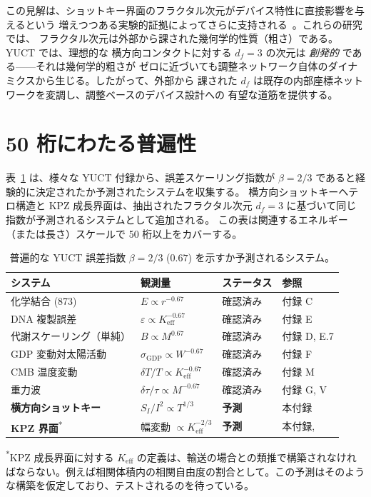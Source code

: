\documentclass[12pt,a4paper]{article}
\newcommand{\Keff}{K_{\mathrm{eff}}}
\theoremstyle{remark}
\begin{document}
	この見解は、ショットキー界面のフラクタル次元がデバイス特性に直接影響を与えるという
	増えつつある実験的証拠によってさらに支持される~\cite{FractalSchottky}。これらの研究では、
	フラクタル次元は外部から課された幾何学的性質（粗さ）である。YUCT では、理想的な
	横方向コンタクトに対する $d_f = 3$ の次元は \emph{創発的} である——それは幾何学的粗さが
	ゼロに近づいても調整ネットワーク自体のダイナミクスから生じる。したがって、外部から
	課された $d_f$ は既存の内部座標ネットワークを変調し、調整ベースのデバイス設計への
	有望な道筋を提供する。
	
	\section{50 桁にわたる普遍性}
	表~\ref{tab:universal-beta} は、様々な YUCT 付録から、誤差スケーリング指数が
	$\beta = 2/3$ であると経験的に決定されたか予測されたシステムを収集する。
	横方向ショットキーヘテロ構造と KPZ 成長界面は、抽出されたフラクタル次元
	$d_f = 3$ に基づいて同じ指数が予測されるシステムとして追加される。
	この表は関連するエネルギー（または長さ）スケールで 50 桁以上をカバーする。
	
	\begin{table}[H]
		\centering
		\caption{普遍的な YUCT 誤差指数 $\beta = 2/3$ ($0.67$) を示すか予測されるシステム。}
		\label{tab:universal-beta}
		\begin{tabular}{@{}llll@{}}
			\toprule
			\textbf{システム} & \textbf{観測量} & \textbf{ステータス} & \textbf{参照}\\
			\midrule
			化学結合 (873)      & $E \propto r^{-0.67}$               & 確認済み  & 付録 C \\
			DNA 複製誤差    & $\varepsilon \propto \Keff^{-0.67}$ & 確認済み  & 付録 E \\
			代謝スケーリング（単純）& $B \propto M^{0.67}$               & 確認済み  & 付録 D, E.7 \\
			GDP 変動対太陽活動   & $\sigma_{\mathrm{GDP}} \propto W^{-0.67}$ & 確認済み & 付録 F \\
			CMB 温度変動    & $\delta T/T \propto \Keff^{-0.67}$ & 確認済み  & 付録 M \\
			重力波       & $\delta\tau/\tau \propto M^{-0.67}$& 確認済み  & 付録 G, V \\
			\textbf{横方向ショットキー} & $S_I/I^2 \propto T^{1/3}$          & \textbf{予測} & 本付録 \\
			\textbf{KPZ 界面}\textsuperscript{*} & 幅変動 $\propto \Keff^{-2/3}$& \textbf{予測} & 本付録, \cite{KPZ}\\
			\bottomrule
		\end{tabular}
		
		\vspace{0.3cm}
		{\footnotesize \textsuperscript{*}KPZ 成長界面に対する $K_{\mathrm{eff}}$ の定義は、輸送の場合との類推で構築されなければならない。例えば相関体積内の相関自由度の割合として。この予測はそのような構築を仮定しており、テストされるのを待っている。}
	\end{table}
	
\end{document}
